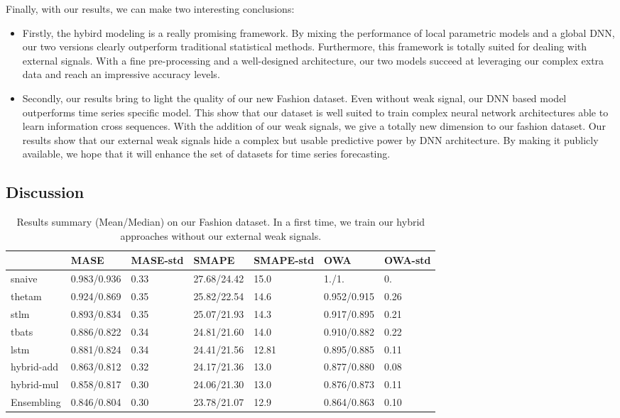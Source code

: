 \documentclass[letterpaper]{article} %
\begin{document}
Finally, with our results, we can make two interesting conclusions: 
\begin{itemize}
    \item Firstly, the hybird modeling is a really promising framework. By mixing the performance of local parametric models and a global DNN, our two versions clearly outperform traditional statistical methods. Furthermore, this framework is totally suited for dealing with external signals. With a fine pre-processing and a well-designed architecture, our two models succeed at leveraging our complex extra data and reach an impressive accuracy levels.
    \item Secondly, our results bring to light the quality of our new Fashion dataset. Even without weak signal, our DNN based model outperforms time series specific model. This show that our dataset is well suited to train complex neural network architectures able to learn information cross sequences. With the addition of our weak signals, we give a totally new dimension to our fashion dataset. Our results show that our external weak signals hide a complex but usable predictive power by DNN architecture. By making it publicly available, we hope that it will enhance the set of datasets for time series forecasting.
\end{itemize} 


\subsection{Discussion}

\begin{table}
  \caption{Results summary (Mean/Median) on our Fashion dataset. In a first time, we train our hybrid approaches without our external weak signals.}
  \label{sample-table}
  \centering
  \begin{tabular}{lllllll}
    \toprule
    &  MASE  & MASE-std & SMAPE & SMAPE-std & OWA & OWA-std  \\
    \midrule
     snaive & 0.983/0.936 & 0.33 & 27.68/24.42 & 15.0 & 1./1. & 0.\\
     thetam & 0.924/0.869  & 0.35 & 25.82/22.54  & 14.6 & 0.952/0.915 & 0.26\\
     stlm & 0.893/0.834 & 0.35 & 25.07/21.93  & 14.3 & 0.917/0.895 & 0.21\\
     tbats & 0.886/0.822  & 0.34 &  24.81/21.60 & 14.0 &  0.910/0.882 & 0.22 \\
     lstm & 0.881/0.824 & 0.34 & 24.41/21.56 & 12.81 & 0.895/0.885 & 0.11 \\
     hybrid-add & 0.863/0.812  & 0.32 & 24.17/21.36 & 13.0 & 0.877/0.880 & 0.08 \\
     hybrid-mul & 0.858/0.817 & 0.30 & 24.06/21.30 & 13.0 & 0.876/0.873 & 0.11 \\
     Ensembling & 0.846/0.804 & 0.30 & 23.78/21.07 & 12.9 & 0.864/0.863 & 0.10  \\
    \bottomrule
  \end{tabular}
\end{table}
\end{document}
